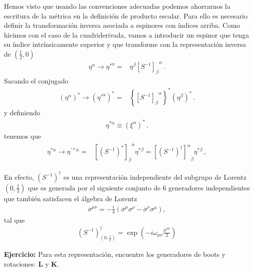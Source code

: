 \begin{frame}
Hemos visto que usando las convenciones adecuadas podemos ahorrarnos
la escritura de la métrica en la definición de producto escalar.
%
Para ello es necesario definir la transformación inversa asociada a
espinores con índices arriba. Como hicimos con el caso de la cuadriderivada, vamos a introducir un espinor que tenga su índice intrínsicamente superior y que transforme con la representación inversa de $(\frac{1}{2},0)$
\begin{align*}
  \eta^{\alpha}\to {\eta'}^{\alpha} =&\eta^\beta{\left[  S^{-1}  \right]_{\beta}}^{\alpha}\,.
\end{align*}
Sacando el conjugado
\begin{align}
 \left( \eta^{\alpha} \right)^{*}\to \left( {\eta'}^{\alpha} \right)^{*} =&\left\{ {\left[  S^{-1}  \right]_{\beta}}^{\alpha} \right\}^{*} \left( \eta^\beta \right)^{*}\,.
\end{align}
y definiendo
\begin{align}
\eta^{*\dot{\alpha}}\equiv  \left( \xi^{\alpha} \right)^{*}\,.
\end{align}
tenemos que
\begin{align*}
  \eta^{*\dot{\alpha}}\to \eta^{\prime *\dot{\alpha}}
  =& {\left[ \left( S^{-1} \right)^{*} \right]_{\dot{\beta}}}^{\dot{\alpha}}\eta^{*\dot{\beta}}={\left[ \left( S^{-1} \right)^{\dagger} \right]^{\dot{\alpha}}}_{\dot{\beta}}\eta^{*\dot{\beta}}\,,
\end{align*}

En efecto, $\left( S^{-1} \right)^{\dagger}$ es una representación independiente del subgrupo de Lorentz $(0,\frac{1}{2})$ que es generada por el siguiente conjunto de 6 generadores independientes que también satisfacen el álgebra de Lorentz
\begin{align*}
  \overline{\sigma}^{\mu\nu}=-\frac{i}{4} \left( \overline{\sigma}^{\mu}\sigma^{\nu}-\overline{\sigma}^{\nu}\sigma^{\mu} \right),
\end{align*}
tal que
\begin{align*}
\left( S^{-1} \right)^{\dagger}_{(0,\frac{1}{2})}=\exp \left( -i \omega_{\mu\nu} \frac{\overline{\sigma}^{\mu\nu}}{2} \right)
\end{align*}

\textbf{Ejercicio:} Para esta representación, encuentre los generadores de boots y rotaciones: $\boldsymbol{L}$ y $\boldsymbol{K}$.

\bigskip


\end{frame}

